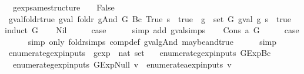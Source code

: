 \begin{isabellebody}
\ \ {\isachardoublequoteopen}gexp{\isacharunderscore}same{\isacharunderscore}structure\ {\isacharunderscore}\ {\isacharunderscore}\ {\isacharequal}\ False{\isachardoublequoteclose}\isanewline
\isanewline
{}\isamarkupfalse%
\ gval{\isacharunderscore}foldr{\isacharunderscore}true{\isacharcolon}\ {\isachardoublequoteopen}{\isacharparenleft}gval\ {\isacharparenleft}foldr\ gAnd\ G\ {\isacharparenleft}Bc\ True{\isacharparenright}{\isacharparenright}\ s\ {\isacharequal}\ true{\isacharparenright}\ {\isacharequal}\ {\isacharparenleft}{\isasymforall}g\ {\isasymin}\ set\ G{\isachardot}\ gval\ g\ s\ {\isacharequal}\ true{\isacharparenright}{\isachardoublequoteclose}\isanewline
%
\isadelimproof
%
\endisadelimproof
%
\isatagproof
{}\isamarkupfalse%
{\isacharparenleft}induct\ G{\isacharparenright}\isanewline
\ \ \isamarkupfalse%
\ Nil\isanewline
\ \ \isamarkupfalse%
\ \isamarkupfalse%
\ {\isacharquery}case\isanewline
\ \ \ \ \isamarkupfalse%
\ {\isacharparenleft}simp\ add{\isacharcolon}\ gval{\isachardot}simps{\isacharparenright}\isanewline
{}\isamarkupfalse%
\isanewline
\ \ \isamarkupfalse%
\ {\isacharparenleft}Cons\ a\ G{\isacharparenright}\isanewline
\ \ \isamarkupfalse%
\ \isamarkupfalse%
\ {\isacharquery}case\isanewline
\ \ \ \ \isamarkupfalse%
\ {\isacharparenleft}simp\ only{\isacharcolon}\ foldr{\isachardot}simps\ comp{\isacharunderscore}def\ gval{\isacharunderscore}gAnd\ maybe{\isacharunderscore}and{\isacharunderscore}true{\isacharparenright}\isanewline
\ \ \ \ \isamarkupfalse%
\ simp\isanewline
{}\isamarkupfalse%
%
\endisatagproof
{\isafoldproof}%
%
\isadelimproof
\isanewline
%
\endisadelimproof
\isanewline
{}\isamarkupfalse%
\ enumerate{\isacharunderscore}gexp{\isacharunderscore}inputs\ {\isacharcolon}{\isacharcolon}\ {\isachardoublequoteopen}gexp\ {\isasymRightarrow}\ nat\ set{\isachardoublequoteclose}\ \isanewline
\ \ {\isachardoublequoteopen}enumerate{\isacharunderscore}gexp{\isacharunderscore}inputs\ {\isacharparenleft}GExp{\isachardot}Bc\ {\isacharunderscore}{\isacharparenright}\ {\isacharequal}\ {\isacharbraceleft}{\isacharbraceright}{\isachardoublequoteclose}\ {\isacharbar}\isanewline
\ \ {\isachardoublequoteopen}enumerate{\isacharunderscore}gexp{\isacharunderscore}inputs\ {\isacharparenleft}GExp{\isachardot}Null\ v{\isacharparenright}\ {\isacharequal}\ enumerate{\isacharunderscore}aexp{\isacharunderscore}inputs\ v{\isachardoublequoteclose}\ {\isacharbar}\isanewline

\end{isabellebody}
